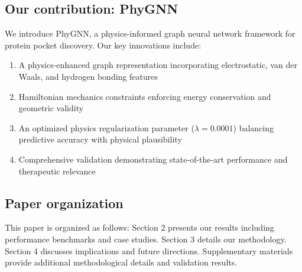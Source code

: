 \subsection*{Our contribution: PhyGNN}
We introduce PhyGNN, a physics-informed graph neural network framework for protein pocket discovery. Our key innovations include:
\begin{enumerate}
    \item A physics-enhanced graph representation incorporating electrostatic, van der Waals, and hydrogen bonding features
    \item Hamiltonian mechanics constraints enforcing energy conservation and geometric validity
    \item An optimized physics regularization parameter ($\lambda = 0.0001$) balancing predictive accuracy with physical plausibility
    \item Comprehensive validation demonstrating state-of-the-art performance and therapeutic relevance
\end{enumerate}

\subsection*{Paper organization}
This paper is organized as follows: Section 2 presents our results including performance benchmarks and case studies. Section 3 details our methodology. Section 4 discusses implications and future directions. Supplementary materials provide additional methodological details and validation results.
